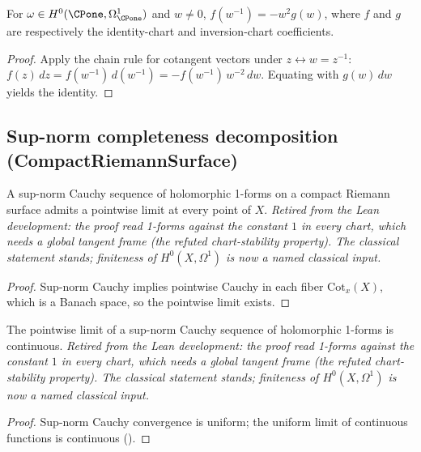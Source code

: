 \begin{lemma}
\label{lem:onepoint-cx-chart-overlap-pullback}
For \(\omega\in H^{0}(\CPone,\Omega^{1}_{\CPone})\) and \(w\neq 0\),
\(f(w^{-1})=-w^{2}g(w)\), where \(f\) and \(g\) are respectively the
identity-chart and inversion-chart coefficients.
\leanok
\end{lemma}
\begin{proof}\leanok
Apply the chain rule for cotangent vectors under
\(z\leftrightarrow w=z^{-1}\):
\(f(z)\,dz=f(w^{-1})\,d(w^{-1})=-f(w^{-1})\,w^{-2}\,dw\). Equating
with \(g(w)\,dw\) yields the identity.
\end{proof}

\subsection{Sup-norm completeness decomposition (CompactRiemannSurface)}
\label{sec:sup-norm-completeness-decomp}

\begin{lemma}
\label{lem:holomorphic-one-form-pointwise-limit-exists}
A sup-norm Cauchy sequence of holomorphic 1-forms on a compact
Riemann surface admits a pointwise limit at every point of \(X\).
\textit{Retired from the Lean development: the proof read 1-forms against the constant
\(1\) in every chart, which needs a global tangent frame (the refuted chart-stability
property). The classical statement stands; finiteness of \(H^0(X,\Omega^1)\) is now a named
classical input.}
\end{lemma}
\begin{proof}\leanok
Sup-norm Cauchy implies pointwise Cauchy in each fiber
\(\mathrm{Cot}_x(X)\), which is a Banach space, so the pointwise limit
exists.
\end{proof}

\begin{lemma}
\label{lem:holomorphic-one-form-limit-continuous}
The pointwise limit of a sup-norm Cauchy sequence of holomorphic
1-forms is continuous.
\textit{Retired from the Lean development: the proof read 1-forms against the constant
\(1\) in every chart, which needs a global tangent frame (the refuted chart-stability
property). The classical statement stands; finiteness of \(H^0(X,\Omega^1)\) is now a named
classical input.}
\end{lemma}
\begin{proof}\leanok
Sup-norm Cauchy convergence is uniform; the uniform limit of
continuous functions is continuous ().
\end{proof}

